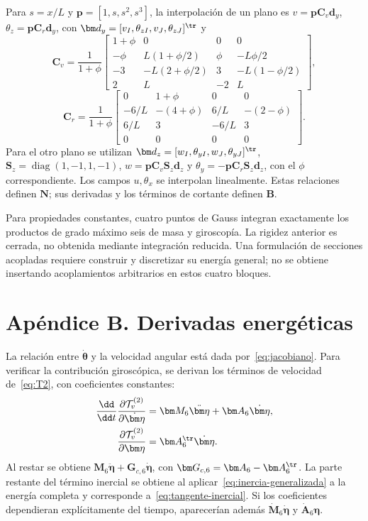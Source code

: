 Para $s=x/L$ y $\bm p=[1,s,s^2,s^3]$, la interpolación de un plano es $v=\bm p\bm C_v\bm d_y$, $\theta_z=\bm p\bm C_r\bm d_y$, con $\bm d_y=[v_I,\theta_{zI},v_J,\theta_{zJ}]^\tr$ y
\begin{equation}
\bm C_v=\frac1{1+\phi}\begin{bmatrix}
1+\phi&0&0&0\\
-\phi&L(1+\phi/2)&\phi&-L\phi/2\\
-3&-L(2+\phi/2)&3&-L(1-\phi/2)\\
2&L&-2&L
\end{bmatrix},
\end{equation}
\begin{equation}
\bm C_r=\frac1{1+\phi}\begin{bmatrix}
0&1+\phi&0&0\\
-6/L&-(4+\phi)&6/L&-(2-\phi)\\
6/L&3&-6/L&3\\0&0&0&0
\end{bmatrix}.
\end{equation}
Para el otro plano se utilizan $\bm d_z=[w_I,\theta_{yI},w_J,\theta_{yJ}]^\tr$, $\bm S_z=\operatorname{diag}(1,-1,1,-1)$, $w=\bm p\bm C_v\bm S_z\bm d_z$ y $\theta_y=-\bm p\bm C_r\bm S_z\bm d_z$, con el $\phi$ correspondiente. Los campos $u,\theta_x$ se interpolan linealmente. Estas relaciones definen $\bm N$; sus derivadas y los términos de cortante definen $\bm B$.

Para propiedades constantes, cuatro puntos de Gauss integran exactamente los productos de grado máximo seis de masa y giroscopía. La rigidez anterior es cerrada, no obtenida mediante integración reducida. Una formulación de secciones acopladas requiere construir y discretizar su energía general; no se obtiene insertando acoplamientos arbitrarios en estos cuatro bloques.

\section{Apéndice B. Derivadas energéticas}
La relación entre $\dot{\bm\theta}$ y la velocidad angular está dada por~\eqref{eq:jacobiano}. Para verificar la contribución giroscópica, se derivan los términos de velocidad de~\eqref{eq:T2}, con coeficientes constantes:
\begin{align}
\frac{\dd}{\dd t}\frac{\partial\mathcal T_v^{(2)}}{\partial\dot{\bm\eta}}
&=\bm M_6\ddot{\bm\eta}+\bm A_6\dot{\bm\eta},\nonumber\\
\frac{\partial\mathcal T_v^{(2)}}{\partial\bm\eta}
&=\bm A_6^\tr\dot{\bm\eta}.
\end{align}
Al restar se obtiene $\bm M_6\ddot{\bm\eta}+\bm G_{c,6}\dot{\bm\eta}$, con $\bm G_{c,6}=\bm A_6-\bm A_6^\tr$. La parte restante del término inercial se obtiene al aplicar~\eqref{eq:inercia-generalizada} a la energía completa y corresponde a~\eqref{eq:tangente-inercial}. Si los coeficientes dependieran explícitamente del tiempo, aparecerían además $\dot{\bm M}_6\dot{\bm\eta}$ y $\dot{\bm A}_6\bm\eta$.

